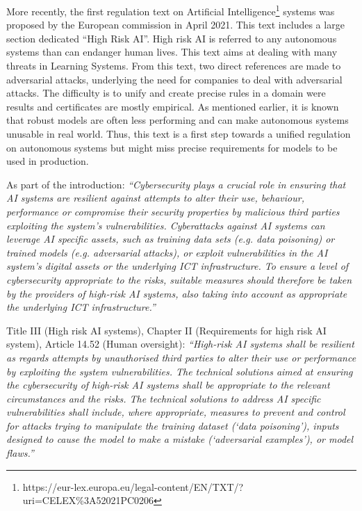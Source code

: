 More recently, the first regulation text on Artificial Intelligence\footnote{https://eur-lex.europa.eu/legal-content/EN/TXT/?uri=CELEX\%3A52021PC0206} systems was proposed by the European commission in April 2021. This text includes a large section dedicated ``High Risk AI''. High risk AI is referred to any autonomous systems than can endanger human lives.  This text aims at dealing with many threats in Learning Systems. From this text, two direct references are made to adversarial attacks, underlying the need for companies to deal with adversarial attacks. The difficulty is to unify and create precise rules in a domain were results and certificates are mostly empirical. As mentioned earlier, it is known that robust models are often less performing and can make autonomous systems unusable in real world. Thus, this text is a first step towards a unified regulation on autonomous systems but might miss precise requirements for models to be used in production.
\medskip
\begin{tcolorbox}[title=References to adversarial examples in European Commission in law proposal on Artificial Intelligence systems]
\label{ref:adversarial_law}
As part of the introduction: \textit{``Cybersecurity plays a crucial role in ensuring that AI systems are resilient against attempts to alter their use, behaviour, performance or compromise their security properties by malicious third parties exploiting the system’s vulnerabilities. Cyberattacks against AI systems can leverage AI specific assets, such as training data sets (e.g. data poisoning) or trained models (e.g. adversarial attacks), or exploit vulnerabilities in the AI system’s digital assets or the underlying ICT infrastructure. To ensure a level of cybersecurity appropriate to the risks, suitable measures should therefore be taken by the providers of high-risk AI systems, also taking into account as appropriate the underlying ICT infrastructure.''}

\medskip
Title III (High risk AI systems), Chapter II (Requirements for high risk AI system), Article 14.52 (Human oversight): \textit{``High-risk AI systems shall be resilient as regards attempts by unauthorised third parties to alter their use or performance by exploiting the system vulnerabilities.
The technical solutions aimed at ensuring the cybersecurity of high-risk AI systems shall be appropriate to the relevant circumstances and the risks.
The technical solutions to address AI specific vulnerabilities shall include, where appropriate, measures to prevent and control for attacks trying to manipulate the training dataset (‘data poisoning’), inputs designed to cause the model to make a mistake (‘adversarial examples’), or model flaws.''}
\end{tcolorbox}
\medskip


